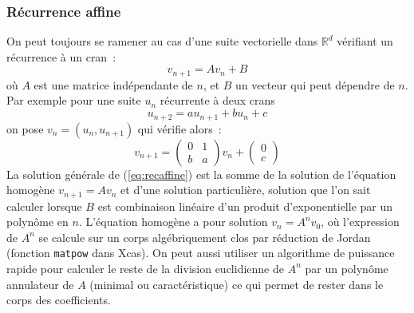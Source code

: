 \documentclass[a4paper,11pt]{article}
\newcommand{\R}{{\mathbb{R}}}
\begin{document}
\begin{giacjshere}
\subsubsection{Récurrence affine}
On peut toujours se ramener au cas d'une suite vectorielle dans $\R^d$
vérifiant un récurrence à un cran~:
\begin{equation} v_{n+1} = A v_n + B \label{eq:recaffine}
\end{equation}
où $A$ est une matrice indépendante de $n$, et $B$ un vecteur qui peut
dépendre de $n$.
Par exemple pour une suite $u_n$ récurrente à deux crans
\[ u_{n+2}=au_{n+1}+bu_n+c\]
on pose $v_n=(u_n,u_{n+1})$ qui vérifie alors~:
\[ v_{n+1}= \left( \begin{array}{cc} 0 & 1 \\ b & a \end{array}\right) v_n + 
\left( \begin{array}{c}0 \\ c\end{array}\right)\] 
La solution générale de (\ref{eq:recaffine}) est la somme de la solution
de l'équation homogène $v_{n+1}=Av_n$ et d'une solution particulière,
solution que l'on sait calculer lorsque $B$ est combinaison linéaire
d'un produit d'exponentielle par un polynôme en $n$.
L'équation homogène a pour solution $v_n=A^n v_0$, où l'expression de $A^n$
se calcule sur un corps algébriquement clos par réduction de Jordan
(fonction \verb|matpow| dans Xcas). On peut aussi utiliser un algorithme
de puissance rapide pour calculer le reste de la division euclidienne
de $A^n$ par un polynôme annulateur de $A$ (minimal ou caractéristique)
ce qui permet de rester dans le corps des coefficients.


\end{giacjshere}
\end{document}

